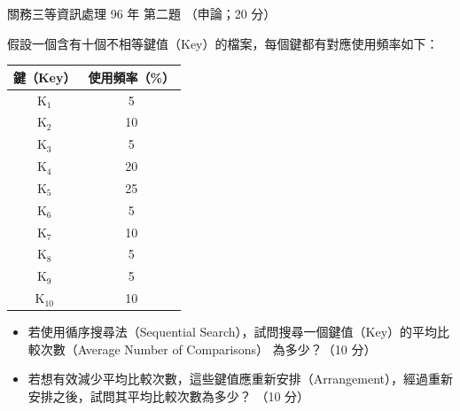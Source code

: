 \begin{pastexam}[label={px:gw3-096-ds-02}]{關務三等資訊處理 96 年 第二題}
（申論；20 分）

假設一個含有十個不相等鍵值（Key）的檔案，每個鍵都有對應使用頻率如下：
\begin{center}
\begin{tabular}{c|c}
鍵（Key） & 使用頻率（\%） \\ \hline
K$_{1}$ & 5 \\
K$_{2}$ & 10 \\
K$_{3}$ & 5 \\
K$_{4}$ & 20 \\
K$_{5}$ & 25 \\
K$_{6}$ & 5 \\
K$_{7}$ & 10 \\
K$_{8}$ & 5 \\
K$_{9}$ & 5 \\
K$_{10}$ & 10 \\
\end{tabular}
\end{center}
\begin{itemize}[leftmargin=2.2em, nosep]
\item[㈠] 若使用循序搜尋法（Sequential Search），試問搜尋一個鍵值（Key）的平均比較次數（Average Number of Comparisons）
為多少？（10 分）
\item[㈡] 若想有效減少平均比較次數，這些鍵值應重新安排（Arrangement），經過重新安排之後，試問其平均比較次數為多少？
（10 分）
\end{itemize}
\end{pastexam}

